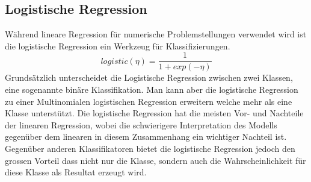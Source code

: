 \documentclass[
  12pt, %
  a4paper, %
  oneside, %
  openany, 
  numbers=noenddot, %
  BCOR=5mm, %
  parskip=half*, %
  thesis, %
]{bfhbook}
\begin{document}
\subsection{Logistische Regression}
\label{logR}
Während lineare Regression für numerische Problemstellungen verwendet wird ist die logistische Regression ein Werkzeug für Klassifizierungen.
\[logistic(\eta)=\frac{1}{1+exp(-\eta)}\]
Grundsätzlich unterscheidet die Logistische Regression zwischen zwei Klassen, eine sogenannte binäre Klassifikation. Man kann aber die logistische Regression zu einer  Multinomialen logistischen Regression erweitern welche mehr als eine Klasse unterstützt.
Die logistische Regression hat die meisten Vor- und Nachteile der linearen Regression, wobei die schwierigere Interpretation des Modells gegenüber dem linearen in diesem Zusammenhang ein wichtiger Nachteil ist. Gegenüber anderen Klassifikatoren bietet die logistische Regression jedoch den grossen Vorteil dass nicht nur die Klasse, sondern auch die Wahrscheinlichkeit für diese Klasse als Resultat erzeugt wird.
\end{document}
